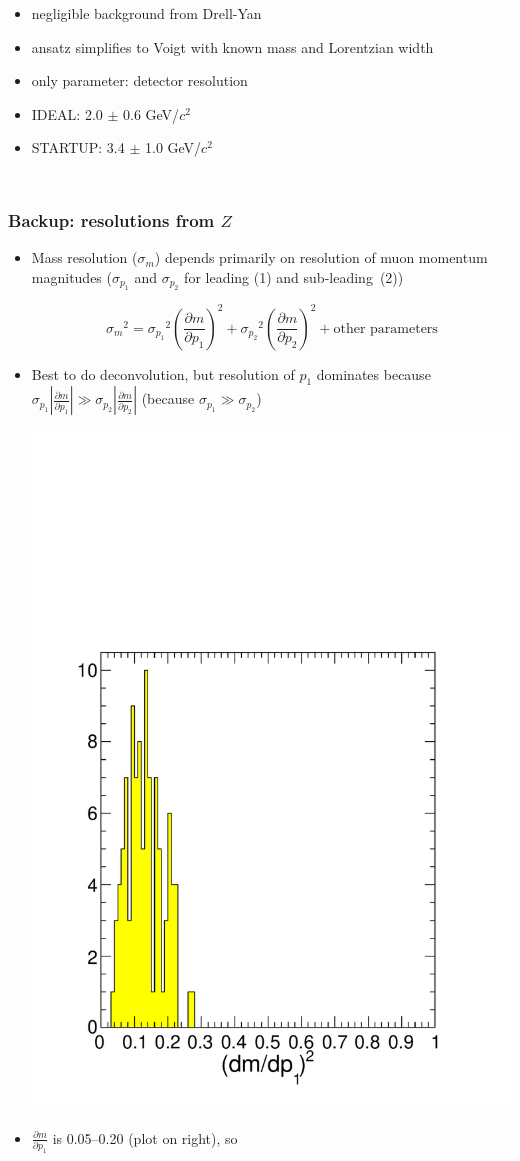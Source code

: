 \documentclass[compress]{beamer}
\begin{document}
\begin{frame}
\begin{columns}
\begin{itemize}
\item negligible background from Drell-Yan
\item ansatz simplifies to Voigt with known mass and Lorentzian width
\item only parameter: detector resolution
\item IDEAL: 2.0 $\pm$ 0.6 GeV/$c^2$
\item STARTUP: 3.4 $\pm$ 1.0 GeV/$c^2$
\end{itemize}
\end{columns}
\end{frame}

\begin{frame}
\frametitle{Backup: resolutions from $Z$}
\begin{itemize}
\item Mass resolution ($\sigma_m$) depends primarily on resolution of
  muon momentum magnitudes ($\sigma_{p_1}$ and $\sigma_{p_2}$ for
  leading {\scriptsize (1)} and \mbox{sub-leading {\scriptsize (2)})\hspace{-1 cm}}

\[ {\sigma_m}^2 = {\sigma_{p_1}}^2 \left(\frac{\partial m}{\partial p_1}\right)^2 + 
{\sigma_{p_2}}^2 \left(\frac{\partial m}{\partial p_2}\right)^2 + \mbox{other parameters} \]

\item Best to do deconvolution, but resolution of $p_1$ dominates
  because $\sigma_{p_1} \left|\frac{\partial m}{\partial
    p_1}\right| \gg \sigma_{p_2} \left|\frac{\partial m}{\partial p_2}\right|$
  (because $\sigma_{p_1} \gg \sigma_{p_2}$)
  
\hfill \includegraphics[width=0.3\linewidth]{hist_deriv1_200.pdf}

\vspace{-3.5 cm}
\item $\displaystyle \frac{\partial m}{\partial p_1}$ is 0.05--0.20 (plot on right), so


\end{itemize}
\end{frame}
\end{document}
